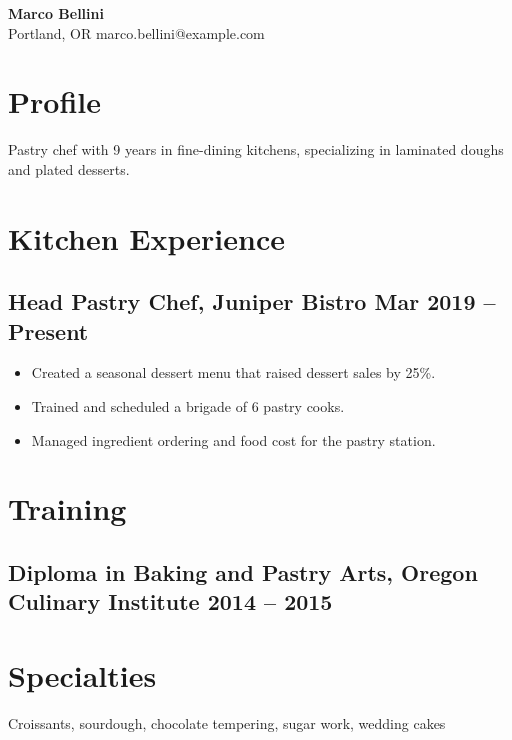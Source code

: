 \documentclass[11pt]{article}
\begin{document}
\begin{center}
  {\Large \textbf{Marco Bellini}}\\
  Portland, OR \textbar{} marco.bellini@example.com
\end{center}

\section*{Profile}
Pastry chef with 9 years in fine-dining kitchens, specializing in laminated doughs and plated desserts.

\section*{Kitchen Experience}
\subsection*{Head Pastry Chef, Juniper Bistro \hfill Mar 2019 -- Present}
\begin{itemize}
  \item Created a seasonal dessert menu that raised dessert sales by 25\%.
  \item Trained and scheduled a brigade of 6 pastry cooks.
  \item Managed ingredient ordering and food cost for the pastry station.
\end{itemize}

\section*{Training}
\subsection*{Diploma in Baking and Pastry Arts, Oregon Culinary Institute \hfill 2014 -- 2015}

\section*{Specialties}
Croissants, sourdough, chocolate tempering, sugar work, wedding cakes
\end{document}
